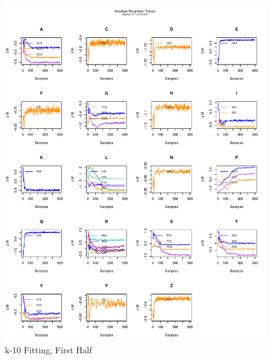 \documentclass[11pt]{labbook}
\begin{document}
    \begin{figure}
        \centering
        \includegraphics[scale=.65]{FONSE_Plots/2016/December_14/k-10_mutation5000}
        \caption{k-10 Fitting, First Half}
        \label{fig:k-10_1MUT}
    \end{figure}
\end{document}
